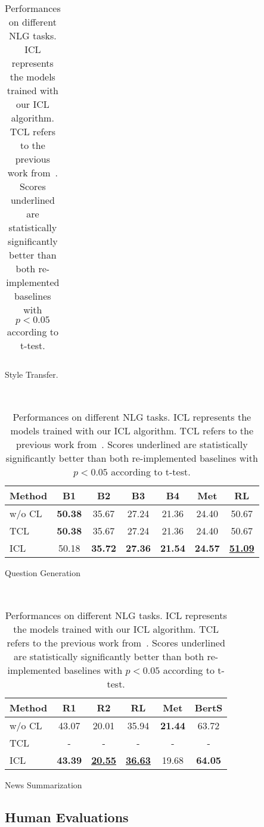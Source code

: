 \begin{table}[th]
\begin{subtable}{\linewidth}
\begin{tabular}{lcccccc}
			\hline
		\end{tabular}
		\caption{Style Transfer.}
		\label{tab:end2endst}
	\end{subtable}
	\\[5pt]
	\begin{subtable}{\linewidth}
		\scriptsize
		\centering
		\begin{tabular}{lcccccc}
			\hline
			{Method} & {B1} & {B2} & {B3} & {B4} & {Met} & {RL}\\
			\hline
			w/o CL & \textbf{50.38} & 35.67 & 27.24 & 21.36 & 24.40 & 50.67 \\
			TCL &\textbf{50.38} & 35.67 & 27.24 & 21.36 & 24.40 & 50.67\\
			ICL &  50.18 & \textbf{35.72} & \textbf{27.36} & \textbf{21.54} & \textbf{24.57} & \underline{\textbf{51.09}} \\
			\hline
		\end{tabular}
		\caption{Question Generation}
		\label{tab:end2endqg}
	\end{subtable}
		\\[5pt]
	\begin{subtable}{\linewidth}
		\scriptsize
		\centering
		\begin{tabular}{lccccc}
			\hline
			{Method} & {R1} & {R2} & {RL} & {Met} & {BertS}\\
			\hline
			w/o CL &  43.07 & 20.01 & 35.94 & \textbf{21.44} & 63.72 \\
			TCL & - & -&- &- &- \\
			ICL & \textbf{43.39} & \underline{\textbf{20.55}} & \underline{\textbf{36.63}} & 19.68 & \textbf{64.05}\\
			\hline
		\end{tabular}
		\caption{News Summarization}
		\label{tab:end2endns}
	\end{subtable}
	\caption{Performances on different NLG tasks. ICL represents the models trained with our ICL algorithm. TCL refers to the previous work from~\cite{liang-etal-2021-token-wise}. Scores underlined are statistically significantly better than both re-implemented baselines with $p<0.05$ according to t-test. }	
	\label{tab:end2end}
\end{table}


\subsection{Human Evaluations}

